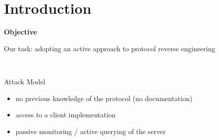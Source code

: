 \documentclass{beamer}
\newcounter{m} %
\newcounter{c} %
\begin{document}
\begin{frame}

\end{frame}


\section{Introduction}

\begin{frame}{\bf Objective}

  Our task: adopting an active approach to protocol reverse engineering

  ~

  \begin{block}{Attack Model}
    \begin{itemize}
      \item no previous knowledge of the protocol (no documentation)
      \item access to a client implementation
      \item passive monitoring / active querying of the server
    \end{itemize}
  \end{block}

\end{frame}
\end{document}
